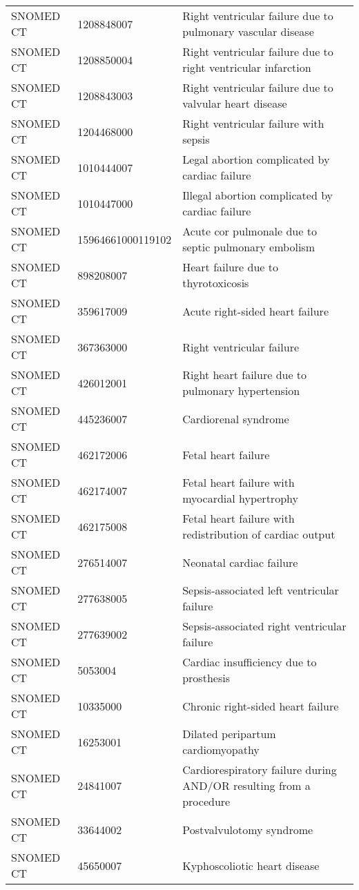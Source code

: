 \begin{longtable}{p{}p{}p{}}
  SNOMED CT & 1208848007 & Right ventricular failure due to pulmonary vascular disease \\ 
  SNOMED CT & 1208850004 & Right ventricular failure due to right ventricular infarction \\ 
  SNOMED CT & 1208843003 & Right ventricular failure due to valvular heart disease \\ 
  SNOMED CT & 1204468000 & Right ventricular failure with sepsis \\ 
  SNOMED CT & 1010444007 & Legal abortion complicated by cardiac failure \\ 
  SNOMED CT & 1010447000 & Illegal abortion complicated by cardiac failure \\ 
  SNOMED CT & 15964661000119102 & Acute cor pulmonale due to septic pulmonary embolism \\ 
  SNOMED CT & 898208007 & Heart failure due to thyrotoxicosis \\ 
  SNOMED CT & 359617009 & Acute right-sided heart failure \\ 
  SNOMED CT & 367363000 & Right ventricular failure \\ 
  SNOMED CT & 426012001 & Right heart failure due to pulmonary hypertension \\ 
  SNOMED CT & 445236007 & Cardiorenal syndrome \\ 
  SNOMED CT & 462172006 & Fetal heart failure \\ 
  SNOMED CT & 462174007 & Fetal heart failure with myocardial hypertrophy \\ 
  SNOMED CT & 462175008 & Fetal heart failure with redistribution of cardiac output \\ 
  SNOMED CT & 276514007 & Neonatal cardiac failure \\ 
  SNOMED CT & 277638005 & Sepsis-associated left ventricular failure \\ 
  SNOMED CT & 277639002 & Sepsis-associated right ventricular failure \\ 
  SNOMED CT & 5053004 & Cardiac insufficiency due to prosthesis \\ 
  SNOMED CT & 10335000 & Chronic right-sided heart failure \\ 
  SNOMED CT & 16253001 & Dilated peripartum cardiomyopathy \\ 
  SNOMED CT & 24841007 & Cardiorespiratory failure during AND/OR resulting from a procedure \\ 
  SNOMED CT & 33644002 & Postvalvulotomy syndrome \\ 
  SNOMED CT & 45650007 & Kyphoscoliotic heart disease \\ 

\end{longtable}
